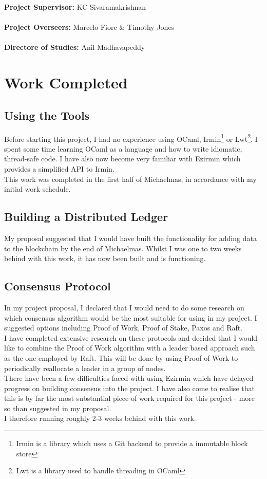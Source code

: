 \documentclass[12pt]{article}
\begin{document}
\maketitle

\noindent \textbf{Project Supervisor:} KC Sivaramakrishnan \\
\\
\textbf{Project Overseers:} Marcelo Fiore \& Timothy Jones\\
\\
\textbf{Directore of Studies:} Anil Madhavapeddy\\

\section{Work Completed}
\subsection*{Using the Tools}
Before starting this project, I had no experience using OCaml, Irmin\footnote{Irmin is a library which uses a Git backend to provide a immutable block store} or Lwt\footnote{Lwt is a library used to handle threading in OCaml}.
I spent some time learning OCaml as a language and how to write idiomatic, thread-safe code. 
I have also now become very familiar with Ezirmin which provides a simplified API to Irmin. \\
This work was completed in the first half of Michaelmas, in accordance with my initial work schedule.
\subsection*{Building a Distributed Ledger}
My proposal suggested that I would have built the functionality for adding data to the blockchain by the end of Michaelmas. 
Whilst I was one to two weeks behind with this work, it has now been built and is functioning.
\subsection*{Consensus Protocol}
In my project proposal, I declared that I would need to do some research on which consensus algorithm would be the most suitable for using in my project. 
I suggested options including Proof of Work, Proof of Stake, Paxos and Raft.\\
I have completed extensive research on these protocols and decided that I would like to combine the Proof of Work algorithm with a leader based approach such as the one employed by Raft. This will be done by using Proof of Work to periodically reallocate a leader in a group of nodes.\\
There have been a few difficulties faced with using Ezirmin which have delayed progress on building consensus into the project. 
I have also come to realise that this is by far the most substantial piece of work required for this project - more so than suggested in my proposal.\\
I therefore running roughly 2-3 weeks behind with this work.
\end{document}
